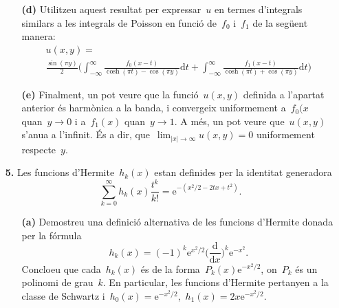 \documentclass[a4paper]{article}
\theoremstyle{plain}
\theoremstyle{definition}
\newcommand{\e}{\mathrm{e}}
\providecommand{\uppi}{\pi}
\newcommand{\diff}{\mathrm{d}}
\newcommand{\abs}[1]{\lvert{#1}\rvert}
\begin{document}
\begin{enumerate}
    \item[]\begin{enumerate}
        \item[\textbf{(d)}] Utilitzeu aquest resultat per expressar~\(u\) en
            termes d'integrals similars a les integrals de Poisson en funció
            de~\(f_{0}\) i~\(f_{1}\) de la següent manera:
            \begin{multline*}
                u(x,y)
                = \\
                \frac{\sin(\uppi y)}{2}
                \biggl(
                    \int_{-\infty}^{\infty}
                    \frac{f_{0}(x-t)}{\cosh(\uppi t)-\cos(\uppi y)}
                    \diff t
                    +
                    \int_{-\infty}^{\infty}
                    \frac{f_{1}(x-t)}{\cosh(\uppi t)+\cos(\uppi y)}
                    \diff t
                \biggr)
            \end{multline*}
    \end{enumerate}
\end{enumerate}

\begin{enumerate}
    \item[]\begin{enumerate}
        \item[\textbf{(e)}] Finalment, un pot veure que la funció~\(u(x,y)\)
            definida a l'apartat anterior és harmònica a la banda, i convergeix
            uniformement a~\(f_{0}(x\) quan~\(y\to0\) i a~\(f_{1}(x)\)
            quan~\(y\to1\).
            A més, un pot veure que~\(u(x,y)\) s'anu{\lgem}a a l'infinit. És a
            dir, que~\(\lim_{\abs{x}\to\infty}u(x,y)=0\) uniformement
            respecte~\(y\).
    \end{enumerate}
\end{enumerate}

\begin{enumerate}
    \item[\textbf{5.}] Les funcions d'Hermite~\(h_{k}(x)\) estan definides per
        la identitat generadora
        \[
            \sum_{k=0}^{\infty}
            h_{k}(x) \frac{t^{k}}{k!}
            =
            \e^{-(x^{2}/2 - 2tx+t^{2})}.
        \]
        \begin{enumerate}
            \item[\textbf{(a)}] Demostreu una definició alternativa de les
                funcions d'Hermite donada per la fórmula
                \[
                    h_{k}(x)
                    =
                    (-1)^{k} \e^{x^{2}/2}
                    \biggl(\frac{\diff}{\diff x}\biggr)^{k}
                    \e^{-x^{2}}.
                \]
                Concloeu que cada~\(h_{k}(x)\) és de la
                forma~\(P_{k}(x)\e^{-x^{2}/2}\), on~\(P_{k}\) és un polinomi de
                grau~\(k\).
                En particular, les funcions d'Hermite pertanyen a la classe de
                Schwartz i~\(h_{0}(x) =
                \e^{-x^{2}/2}\),~\(h_{1}(x)=2x\e^{-x^{2}/2}\).
        \end{enumerate}
\end{enumerate}
\end{document}

